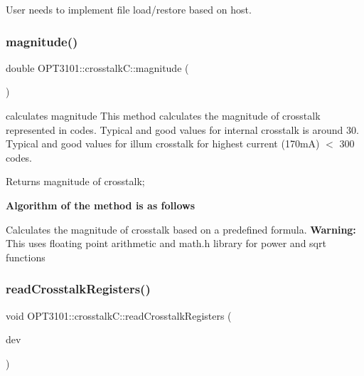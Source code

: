 \begin{DoxyItemize}
\item User needs to implement file load/restore based on host. 
\end{DoxyItemize}\mbox{\label{class_o_p_t3101_1_1crosstalk_c_a3f569027c07fb3fb49a02ae3108e34c1}} 
\subsubsection{\texorpdfstring{magnitude()}{magnitude()}}
{\footnotesize\ttfamily double O\+P\+T3101\+::crosstalk\+C\+::magnitude (\begin{DoxyParamCaption}{ }\end{DoxyParamCaption})}



calculates magnitude This method calculates the magnitude of crosstalk represented in codes. Typical and good values for internal crosstalk is around 30. Typical and good values for illum crosstalk for highest current (170mA) $<$ 300 codes. 

\begin{DoxyReturn}{Returns}
magnitude of crosstalk; 
\end{DoxyReturn}
{\bfseries Algorithm of the method is as follows}


\begin{DoxyItemize}
\item Calculates the magnitude of crosstalk based on a predefined formula. {\bfseries Warning\+:} This uses floating point arithmetic and math.\+h library for power and sqrt functions 
\end{DoxyItemize}\mbox{\label{class_o_p_t3101_1_1crosstalk_c_acdfb870a70a6bc565d3a190fa459eeab}} 
\subsubsection{\texorpdfstring{read\+Crosstalk\+Registers()}{readCrosstalkRegisters()}}
{\footnotesize\ttfamily void O\+P\+T3101\+::crosstalk\+C\+::read\+Crosstalk\+Registers (\begin{DoxyParamCaption}\item[{\mbox{\hyperlink{class_o_p_t3101_1_1device}{O\+P\+T3101\+::device}} $\ast$}]{dev }\end{DoxyParamCaption})}



